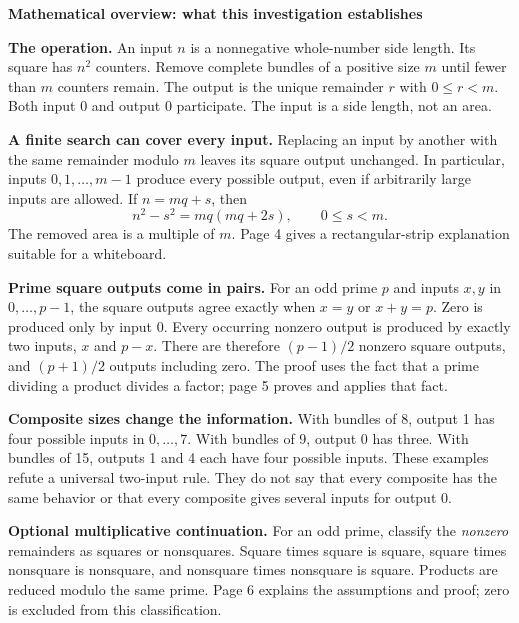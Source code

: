 \documentclass[11pt]{article}
\newcommand{\head}[1]{\par\textbf{\large #1}\par}
\begin{document}
\head{Mathematical overview: what this investigation establishes}
\textbf{The operation.} An input $n$ is a nonnegative whole-number side length. Its square has $n^2$ counters. Remove complete bundles of a positive size $m$ until fewer than $m$ counters remain. The output is the unique remainder $r$ with $0\le r<m$. Both input 0 and output 0 participate. The input is a side length, not an area.

\textbf{A finite search can cover every input.} Replacing an input by another with the same remainder modulo $m$ leaves its square output unchanged. In particular, inputs $0,1,\ldots,m-1$ produce every possible output, even if arbitrarily large inputs are allowed. If $n=mq+s$, then
\[
 n^2-s^2=mq(mq+2s),\qquad 0\le s<m.
\]
The removed area is a multiple of $m$. Page 4 gives a rectangular-strip explanation suitable for a whiteboard.

\textbf{Prime square outputs come in pairs.} For an odd prime $p$ and inputs $x,y$ in $0,\ldots,p-1$, the square outputs agree exactly when $x=y$ or $x+y=p$. Zero is produced only by input 0. Every occurring nonzero output is produced by exactly two inputs, $x$ and $p-x$. There are therefore $(p-1)/2$ nonzero square outputs, and $(p+1)/2$ outputs including zero. The proof uses the fact that a prime dividing a product divides a factor; page 5 proves and applies that fact.

\textbf{Composite sizes change the information.} With bundles of 8, output 1 has four possible inputs in $0,\ldots,7$. With bundles of 9, output 0 has three. With bundles of 15, outputs 1 and 4 each have four possible inputs. These examples refute a universal two-input rule. They do not say that every composite has the same behavior or that every composite gives several inputs for output 0.

\textbf{Optional multiplicative continuation.} For an odd prime, classify the \emph{nonzero} remainders as squares or nonsquares. Square times square is square, square times nonsquare is nonsquare, and nonsquare times nonsquare is square. Products are reduced modulo the same prime. Page 6 explains the assumptions and proof; zero is excluded from this classification.
\end{document}
